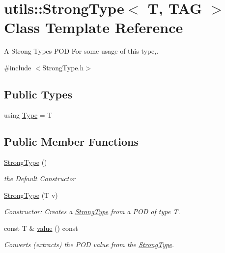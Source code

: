 \hypertarget{classutils_1_1_strong_type}{}\section{utils\+::Strong\+Type$<$ T, T\+AG $>$ Class Template Reference}
\label{classutils_1_1_strong_type}


A Strong Types P\+OD For some usage of this type,.  




{\ttfamily \#include $<$Strong\+Type.\+h$>$}

\subsection*{Public Types}
\begin{DoxyCompactItemize}
\item 
using \mbox{\hyperlink{classutils_1_1_strong_type_a9acc2a79e43583e64f171f130b2ad2fd}{Type}} = T
\end{DoxyCompactItemize}
\subsection*{Public Member Functions}
\begin{DoxyCompactItemize}
\item 
\mbox{\hyperlink{classutils_1_1_strong_type_ac339169b918b4504fb4de14041a484a6}{Strong\+Type}} ()
\begin{DoxyCompactList}\small\item\em the Default Constructor \end{DoxyCompactList}\item 
\mbox{\hyperlink{classutils_1_1_strong_type_ad6ee273caf31d89663d0b20098156df7}{Strong\+Type}} (T v)
\begin{DoxyCompactList}\small\item\em Constructor\+: Creates a \mbox{\hyperlink{classutils_1_1_strong_type}{Strong\+Type}} from a P\+OD of type T. \end{DoxyCompactList}\item 
const T \& \mbox{\hyperlink{classutils_1_1_strong_type_a5a3cf8fec3efd22bf2b54909b3e8ce10}{value}} () const
\begin{DoxyCompactList}\small\item\em Converts (extracts) the P\+OD value from the \mbox{\hyperlink{classutils_1_1_strong_type}{Strong\+Type}}. \end{DoxyCompactList}\end{DoxyCompactItemize}


